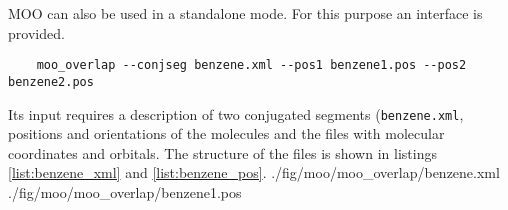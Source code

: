 MOO can also be used in a standalone mode. For this purpose an interface \overlap is provided. 
\begin{verbatim}
    moo_overlap --conjseg benzene.xml --pos1 benzene1.pos --pos2 benzene2.pos
\end{verbatim}
Its input requires a description of two conjugated segments (\texttt{benzene.xml}, positions and orientations of the molecules and the files with molecular coordinates and orbitals. The structure of the files is shown in listings \ref{list:benzene_xml} and  \ref{list:benzene_pos}.
\vskip 0.1cm
 {./fig/moo/moo_overlap/benzene.xml}
\vskip 0.1cm
 {./fig/moo/moo_overlap/benzene1.pos}

